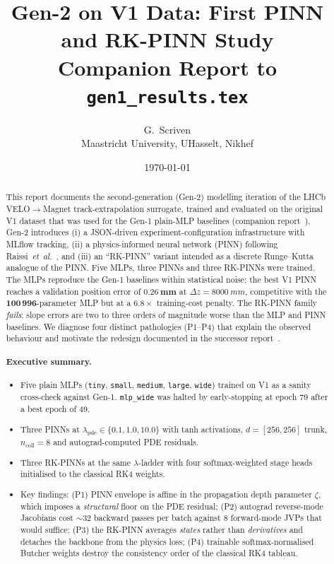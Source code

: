 \documentclass[a4paper,11pt]{article}
\title{Gen-2 on V1 Data: First PINN and RK-PINN Study\\\large Companion Report to \texttt{gen1\_results.tex}}
\author{G.~Scriven\\\small Maastricht University, UHasselt, Nikhef}
\date{\today}
\newcommand{\SI}[2]{#1~#2}
\newcommand{\dz}{\Delta z}
\begin{document}
\maketitle

\begin{abstract}
This report documents the second-generation (Gen-2) modelling iteration of the
LHCb VELO$\to$Magnet track-extrapolation surrogate, trained and evaluated on
the original V1 dataset that was used for the Gen-1 plain-MLP baselines
(companion report~\cite{gen1report}). Gen-2 introduces (i) a JSON-driven
experiment-configuration infrastructure with MLflow tracking, (ii) a
physics-informed neural network (PINN) following
Raissi~\textit{et~al.}~\cite{raissi2019}, and (iii) an ``RK-PINN'' variant
intended as a discrete Runge--Kutta analogue of the PINN. Five MLPs, three
PINNs and three RK-PINNs were trained. The MLPs reproduce the Gen-1 baselines
within statistical noise; the best V1 PINN reaches a validation position error
of $\mathbf{0.26~mm}$ at $\dz=\SI{8000}{mm}$, competitive with the
$\mathbf{100\,996}$-parameter MLP but at a $\mathbf{6.8\times}$ training-cost
penalty. The RK-PINN family \emph{fails}: slope errors are two to three orders
of magnitude worse than the MLP and PINN baselines. We diagnose four distinct
pathologies (P1--P4) that explain the observed behaviour and motivate the
redesign documented in the successor report~\cite{gen2newreport}.

\paragraph{Executive summary.}
\begin{itemize}
  \item Five plain MLPs (\texttt{tiny}, \texttt{small}, \texttt{medium},
        \texttt{large}, \texttt{wide}) trained on V1 as a sanity cross-check
        against Gen-1. \texttt{mlp\_wide} was halted by early-stopping at
        epoch 79 after a best epoch of 49.
  \item Three PINNs at $\lambda_{\mathrm{pde}}\in\{0.1,1.0,10.0\}$ with
        tanh activations, $d\!=\![256,256]$ trunk, $n_{\mathrm{coll}}=8$
        and autograd-computed PDE residuals.
  \item Three RK-PINNs at the same $\lambda$-ladder with four softmax-weighted
        stage heads initialised to the classical RK4 weights.
  \item Key findings: (P1) PINN envelope is affine in the propagation depth
        parameter $\zeta$, which imposes a \emph{structural} floor on the PDE
        residual; (P2) autograd reverse-mode Jacobians cost $\sim\!32$
        backward passes per batch against $8$ forward-mode JVPs that would
        suffice; (P3) the RK-PINN averages \emph{states} rather than
        \emph{derivatives} and detaches the backbone from the physics loss;
        (P4) trainable softmax-normalised Butcher weights destroy the
        consistency order of the classical RK4 tableau.
\end{itemize}
\end{abstract}
\end{document}
